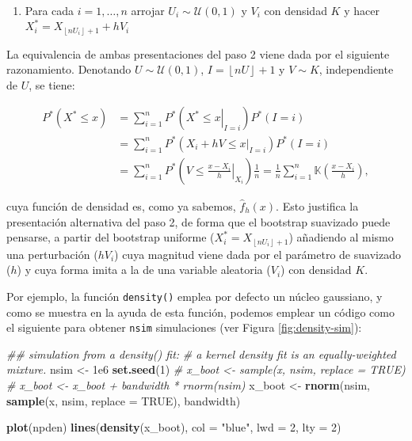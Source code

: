 \documentclass[
]{book}
\newenvironment{Shaded}{\begin{snugshade}}{\end{snugshade}}
\newcommand{\CommentTok}[1]{\textcolor[rgb]{0.56,0.35,0.01}{\textit{#1}}}
\newcommand{\DataTypeTok}[1]{\textcolor[rgb]{0.13,0.29,0.53}{#1}}
\newcommand{\DecValTok}[1]{\textcolor[rgb]{0.00,0.00,0.81}{#1}}
\newcommand{\FloatTok}[1]{\textcolor[rgb]{0.00,0.00,0.81}{#1}}
\newcommand{\KeywordTok}[1]{\textcolor[rgb]{0.13,0.29,0.53}{\textbf{#1}}}
\newcommand{\NormalTok}[1]{#1}
\newcommand{\OtherTok}[1]{\textcolor[rgb]{0.56,0.35,0.01}{#1}}
\newcommand{\StringTok}[1]{\textcolor[rgb]{0.31,0.60,0.02}{#1}}
\providecommand{\tightlist}{%
  \setlength{\itemsep}{0pt}\setlength{\parskip}{0pt}}
\theoremstyle{definition}
\theoremstyle{definition}
\theoremstyle{definition}
\theoremstyle{remark}
\begin{document}
\begin{enumerate}
\def\labelenumi{\arabic{enumi}.}
\setcounter{enumi}{1}
\tightlist
\item
  Para cada \(i=1,\ldots ,n\) arrojar \(U_i\sim \mathcal{U}\left( 0,1 \right)\) y
  \(V_i\) con densidad \(K\) y hacer \(X_i^{\ast}=X_{\left\lfloor nU_i\right\rfloor +1}+hV_i\)
\end{enumerate}

La equivalencia de ambas presentaciones del paso 2 viene dada por el
siguiente razonamiento. Denotando \(U\sim \mathcal{U}\left( 0,1 \right)\),
\(I=\left\lfloor nU\right\rfloor +1\) y \(V\sim K\), independiente de \(U\), se
tiene:

\[\begin{aligned}
P^{\ast}\left( X^{\ast}\leq x \right) &= \sum_{i=1}^{n}P^{\ast}\left(
\left. X^{\ast}\leq x\right\vert _{I=i} \right) P^{\ast}\left( I=i \right) \\
&= \sum_{i=1}^{n}P^{\ast}\left( \left. X_i+hV\leq x\right\vert
_{I=i} \right) P^{\ast}\left( I=i \right) \\
&= \sum_{i=1}^{n}P^{\ast}\left( \left. V\leq \frac{x-X_i}{h}
\right\vert _{X_i} \right) \frac{1}{n}=\frac{1}{n}\sum_{i=1}^{n}\mathbb{K}
\left( \frac{x-X_i}{h} \right),
\end{aligned}\]

cuya función de densidad es, como ya sabemos, \(\hat{f}_{h}\left( x \right)\). Esto justifica la presentación alternativa del paso 2, de
forma que el bootstrap suavizado puede pensarse, a partir del bootstrap
uniforme (\(X_i^{\ast}=X_{\left\lfloor nU_i\right\rfloor +1}\))
añadiendo al mismo una perturbación (\(hV_i\)) cuya magnitud viene dada
por el parámetro de suavizado (\(h\)) y cuya forma imita a la de una
variable aleatoria (\(V_i\)) con densidad \(K\).

Por ejemplo, la función \texttt{density()} emplea por defecto un núcleo
gaussiano, y como se muestra en la ayuda de esta función,
podemos emplear un código como el siguiente para obtener
\texttt{nsim} simulaciones (ver Figura \ref{fig:density-sim}):

\begin{Shaded}
\begin{Highlighting}[]
\CommentTok{## simulation from a density() fit:}
\CommentTok{# a kernel density fit is an equally-weighted mixture.}
\NormalTok{nsim <-}\StringTok{ }\FloatTok{1e6}
\KeywordTok{set.seed}\NormalTok{(}\DecValTok{1}\NormalTok{)}
\CommentTok{# x_boot <- sample(x, nsim, replace = TRUE)}
\CommentTok{# x_boot <- x_boot + bandwidth * rnorm(nsim)}
\NormalTok{x_boot <-}\StringTok{ }\KeywordTok{rnorm}\NormalTok{(nsim, }\KeywordTok{sample}\NormalTok{(x, nsim, }\DataTypeTok{replace =} \OtherTok{TRUE}\NormalTok{), bandwidth)}

\KeywordTok{plot}\NormalTok{(npden)}
\KeywordTok{lines}\NormalTok{(}\KeywordTok{density}\NormalTok{(x_boot), }\DataTypeTok{col =} \StringTok{"blue"}\NormalTok{, }\DataTypeTok{lwd =} \DecValTok{2}\NormalTok{, }\DataTypeTok{lty =} \DecValTok{2}\NormalTok{)}
\end{Highlighting}
\end{Shaded}
\end{document}
